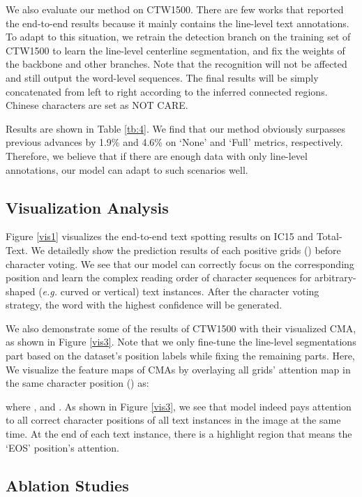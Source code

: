 \documentclass[letterpaper]{article} \usepackage{aaai21}  \usepackage{times}  \usepackage{helvet} \usepackage{courier}  \usepackage[hyphens]{url}  \usepackage{graphicx} \urlstyle{rm} \def\UrlFont{\rm}  \usepackage{natbib}  \usepackage{caption} \frenchspacing  \setlength{\pdfpagewidth}{8.5in}  \setlength{\pdfpageheight}{11in}  \usepackage{multirow}
\begin{document}
We also evaluate our method on CTW1500. There are few works that reported the end-to-end results because it mainly contains the line-level text annotations.
To adapt to this situation, we retrain the detection branch on the training set of CTW1500 to learn the line-level centerline segmentation, and fix the weights of the backbone and other branches. Note that the recognition will not be affected and still output the word-level sequences. The final results will be simply concatenated from left to right according to the inferred connected regions. Chinese characters are set as NOT CARE.

Results are shown in Table \ref{tb:4}. We find that our method obviously surpasses previous advances by 1.9\% and 4.6\% on `None' and `Full' metrics, respectively.
Therefore, we believe that if there are enough data with only line-level annotations, our model can adapt to such scenarios well.

\subsection{Visualization Analysis}
Figure \ref{vis1} visualizes the end-to-end text spotting results on IC15 and Total-Text.
We detailedly show the prediction results of each positive grids () before character voting.
We see that our model can correctly focus on the corresponding position and learn the complex reading order of character sequences for arbitrary-shaped (\emph{e.g.} curved or vertical) text instances.
After the character voting strategy, the word with the highest confidence will be generated.



We also demonstrate some of the results of CTW1500 with their visualized CMA, as shown in Figure \ref{vis3}.
Note that we only fine-tune the line-level segmentations part based on the dataset's position labels while fixing the remaining parts.
Here, We visualize the feature maps of CMAs by overlaying all grids' attention map in the same character position () as:

where , and .
As shown in Figure \ref{vis3}, we see that model indeed pays attention to all correct character positions of all text instances in the image at the same time.  At the end of each text instance, there is a highlight region that means the `EOS' position's attention.




\subsection{Ablation Studies}
\end{document}
